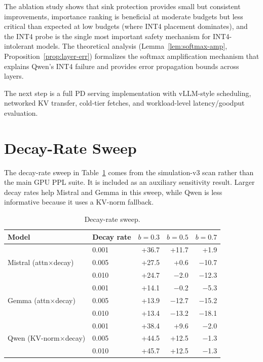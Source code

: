 \documentclass[11pt]{article}
\newcommand{\budget}{b}
\theoremstyle{plain}
\theoremstyle{definition}
\begin{document}
The ablation study shows that sink protection provides small but consistent improvements, importance ranking is beneficial at moderate budgets but less critical than expected at low budgets (where INT4 placement dominates), and the INT4 probe is the single most important safety mechanism for INT4-intolerant models.  The theoretical analysis (Lemma~\ref{lem:softmax-amp}, Proposition~\ref{prop:layer-err}) formalizes the softmax amplification mechanism that explains Qwen's INT4 failure and provides error propagation bounds across layers.

The next step is a full PD serving implementation with vLLM-style scheduling, networked KV transfer, cold-tier fetches, and workload-level latency/goodput evaluation.




\appendix

\section{Decay-Rate Sweep}
\label{app:decay}

The decay-rate sweep in Table~\ref{tab:decay} comes from the simulation-v3 scan rather than the main GPU PPL suite.  It is included as an auxiliary sensitivity result.  Larger decay rates help Mistral and Gemma in this sweep, while Qwen is less informative because it uses a KV-norm fallback.

\begin{table}[H]
\centering
\caption{Decay-rate sweep.}
\label{tab:decay}
\small
\begin{tabular}{llrrr}
\toprule
Model & Decay rate & $\budget=0.3$ & $\budget=0.5$ & $\budget=0.7$ \\
\midrule
\multirow{3}{*}{Mistral (attn$\times$decay)} & 0.001 & +36.7 & +11.7 & +1.9 \\
 & 0.005 & +27.5 & +0.6 & $-$10.7 \\
 & 0.010 & +24.7 & $-$2.0 & $-$12.3 \\
\midrule
\multirow{3}{*}{Gemma (attn$\times$decay)} & 0.001 & +14.1 & $-$0.2 & $-$5.3 \\
 & 0.005 & +13.9 & $-$12.7 & $-$15.2 \\
 & 0.010 & +13.4 & $-$13.2 & $-$18.1 \\
\midrule
\multirow{3}{*}{Qwen (KV-norm$\times$decay)} & 0.001 & +38.4 & +9.6 & $-$2.0 \\
 & 0.005 & +44.5 & +12.5 & $-$1.3 \\
 & 0.010 & +45.7 & +12.5 & $-$1.3 \\
\bottomrule
\end{tabular}
\end{table}
\end{document}
